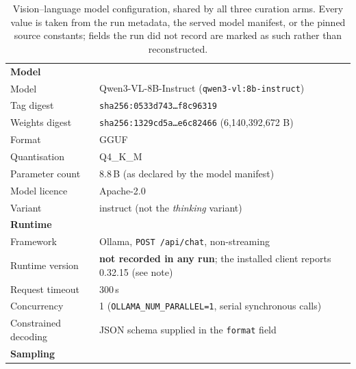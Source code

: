 %

\begin{table}[t]
\centering
\caption{Vision--language model configuration, shared by all three curation
arms. Every value is taken from the run metadata, the served model manifest, or
the pinned source constants; fields the run did not record are marked as such
rather than reconstructed.}
\label{tab:vlmconfig}
\small
\begin{tabular}{ll}
\toprule
\multicolumn{2}{l}{\textbf{Model}} \\
Model            & Qwen3-VL-8B-Instruct (\texttt{qwen3-vl:8b-instruct}) \\
Tag digest       & \texttt{sha256:0533d743\ldots f8c96319} \\
Weights digest   & \texttt{sha256:1329cd5a\ldots e6c82466} (6{,}140{,}392{,}672 B) \\
Format           & GGUF \\
Quantisation     & Q4\_K\_M \\
Parameter count  & 8.8\,B (as declared by the model manifest) \\
Model licence    & Apache-2.0 \\
Variant          & instruct (not the \emph{thinking} variant) \\
\midrule
\multicolumn{2}{l}{\textbf{Runtime}} \\
Framework        & Ollama, \texttt{POST /api/chat}, non-streaming \\
Runtime version  & \textbf{not recorded in any run}; the installed client
                   reports 0.32.15 (see note) \\
Request timeout  & 300\,s \\
Concurrency      & 1 (\texttt{OLLAMA\_NUM\_PARALLEL=1}, serial synchronous calls) \\
Constrained decoding & JSON schema supplied in the \texttt{format} field \\
\midrule
\multicolumn{2}{l}{\textbf{Sampling}} \\

\end{tabular}
\end{table}
